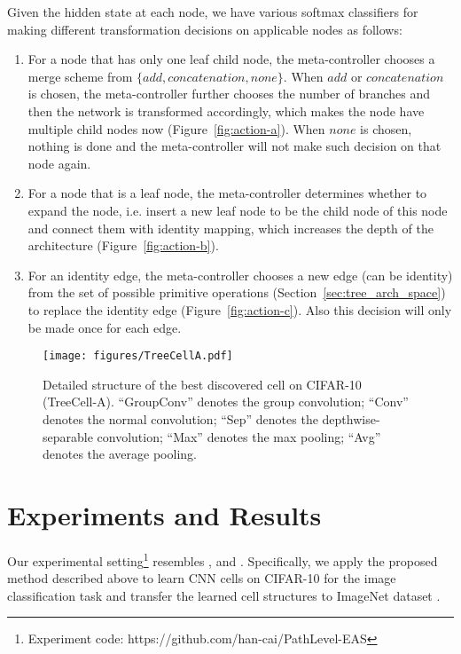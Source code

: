 \documentclass{article}
\begin{document}
Given the hidden state at each node, we have various softmax classifiers for making different transformation decisions on applicable nodes as follows:

\begin{enumerate}
	\item For a node that has only one leaf child node, the meta-controller chooses a merge scheme from $\{add, concatenation, none\}$. When $add$ or $concatenation$ is chosen, the meta-controller further chooses the number of branches and then the network is transformed accordingly, which makes the node have multiple child nodes now (Figure~\ref{fig:action-a}). When $none$ is chosen, nothing is done and the meta-controller will not make such decision on that node again. 
	\item For a node that is a leaf node, the meta-controller determines whether to expand the node, i.e. insert a new leaf node to be the child node of this node and connect them with identity mapping, which increases the depth of the architecture (Figure~\ref{fig:action-b}).
	\item For an identity edge, the meta-controller chooses a new edge (can be identity) from the set of possible primitive operations (Section~\ref{sec:tree_arch_space}) to replace the identity edge (Figure~\ref{fig:action-c}). Also this decision will only be made once for each edge. 
\end{enumerate}

\begin{figure}[t]
	\centering
	\texttt{[image: figures/TreeCellA.pdf]}
    \vspace{-10pt}
	\caption{Detailed structure of the best discovered cell on CIFAR-10 (TreeCell-A). ``GroupConv'' denotes the group convolution; ``Conv'' denotes the normal convolution; ``Sep'' denotes the depthwise-separable convolution; ``Max'' denotes the max pooling; ``Avg'' denotes the average pooling.}
	\label{fig:tree-cell-a}
\end{figure}

\section{Experiments and Results}\label{sec:exp}
Our experimental setting\footnote{Experiment code: https://github.com/han-cai/PathLevel-EAS} resembles \citet{zoph2017learning}, \citet{zhong2017practical} and \citet{liu2017hierarchical}. Specifically, we apply the proposed method described above to learn CNN cells on CIFAR-10 \cite{krizhevsky2009learning} for the image classification task and transfer the learned cell structures to ImageNet dataset \cite{deng2009imagenet}.
\end{document}
